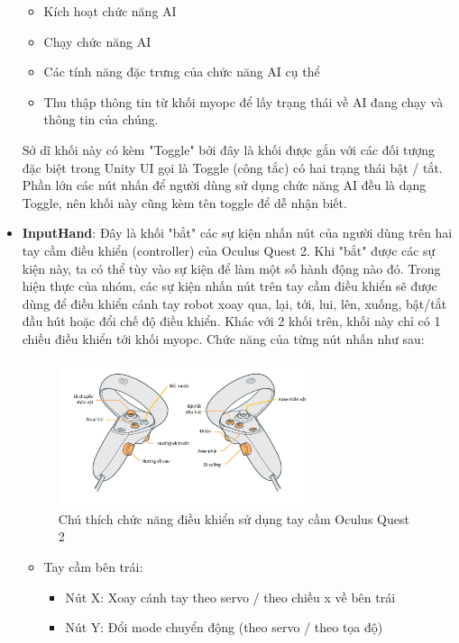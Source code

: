 \begin{itemize}
    \begin{itemize}
        \item Kích hoạt chức năng AI
        \item Chạy chức năng AI
        \item Các tính năng đặc trưng của chức năng AI cụ thể
        \item Thu thập thông tin từ khối myopc để lấy trạng thái về AI đang chạy và thông tin của chúng.
    \end{itemize}
    Sở dĩ khối này có kèm "Toggle" bởi đây là khối được gắn với các đối tượng đặc biệt trong Unity UI gọi là Toggle (công tắc) có hai trạng thái bật / tắt. Phần lớn các nút nhấn để người dùng sử dụng chức năng AI đều là dạng Toggle, nên khối này cũng kèm tên toggle để dễ nhận biết.
    \item \textbf{InputHand}: Đây là khối "bắt" các sự kiện nhấn nút của người dùng trên hai tay cầm điều khiển (controller) của Oculus Quest 2. Khi "bắt" được các sự kiện này, ta có thể tùy vào sự kiện để làm một số hành động nào đó. Trong hiện thực của nhóm, các sự kiện nhấn nút trên tay cầm điều khiển sẽ được dùng để điều khiển cánh tay robot xoay qua, lại, tới, lui, lên, xuống, bật/tắt đầu hút hoặc đổi chế độ điều khiển. Khác với 2 khối trên, khối này chỉ có 1 chiều điều khiển tới khối myopc. Chức năng của từng nút nhấn như sau:
    \begin{figure}[H]
        \centering
        \includegraphics[width=0.7\textwidth]{Images/Implementation/VRapp/VR_button_controller.jpg}
        \caption{Chú thích chức năng điều khiển sử dụng tay cầm Oculus Quest 2}
        \label{fig:controller_func}
    \end{figure}
    \begin{itemize}
        \item Tay cầm bên trái:
        \begin{itemize}
            \item Nút X: Xoay cánh tay theo servo / theo chiều x về bên trái
            \item Nút Y: Đổi mode chuyển động (theo servo / theo tọa độ)

\end{itemize}
\end{itemize}
\end{itemize}
